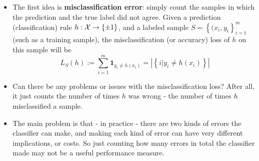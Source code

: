   \begin{itemize}
    \item The first idea is {\bf misclassification error}: simply count the
      samples in which the prediction and the true label did not agree. 
      Given a prediction (classification) rule $h:\mathcal{X}\to \left\{ \pm 1
      \right\}$, and a labeled sample $S=\left\{ (x_i,y_i \right\}_{i=1}^m$ (such as a
	training sample), the misclassification (or accuracy) 
	loss of $h$ on this sample will be 
	\[
	  L_S(h) := \sum_{i=1}^m \mathbf{1}_{y_i\neq h(x_i)} = 
	  |\left\{ i|y_i \neq h(x_i) \right\}|
	\]
      \item Can there be any problems or issues with the misclassification loss?
	After all, it just counts the number of times $h$ was  wrong - the number
	of times $h$ misclassified a sample. 
      \item The main problem is that - in practice - there are two kinds of
	errors the classifier can make, and making each kind of error can have
	very different implications, or costs. So just counting how many errors
	in total the classifier made may not be a useful performance measure. 
         \end{itemize}

